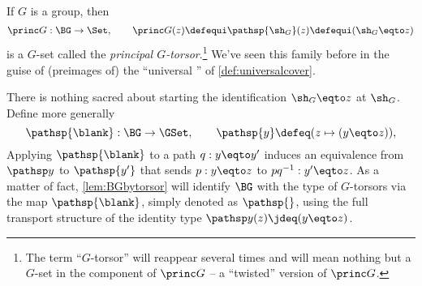 \begin{example}\label{def:principaltorsor}
  If $G$ is a group, then
  \[
    \princ G:\BG\to\Set,
    \qquad\princ G(z)\defequi\pathsp{\sh_G}(z)\defequi(\sh_G \eqto z)
  \]
  is a $G$-set called the \emph{principal $G$-torsor}.\footnote{%
    The term ``$G$-torsor'' will reappear several times and will mean nothing but a $G$-set in the component of $\princ G$ -- a ``twisted'' version of $\princ G$.}
  We've seen this family before in the guise of (preimages of) the
  ``universal \covering'' of \cref{def:universalcover}.

  There is nothing sacred about starting the identification
  $\sh_G \eqto z$ at $\sh_G$.
  Define more generally
  \begin{equation}\label{eq:pathsp}
    \pathsp{\blank}:\BG\to\GSet,
    \qquad
    \pathsp{y} \defeq (z \mapsto (y\eqto z)),
  \end{equation}
  Applying $\pathsp{\blank}$ to a path $q:y\eqto y'$
  induces an equivalence from $\pathsp y$ to $\pathsp {y'}$ that sends $p:y \eqto z$
  to $pq^{-1}:y'\eqto z$.
  As a matter of fact, \cref{lem:BGbytorsor} will identify $\BG$ with the type of
  $G$-torsors via the map $\pathsp{\blank}$, simply denoted as $\pathsp{}$,
  using the full transport structure of the identity type $\pathsp y(z)\jdeq(y \eqto z)$.
\end{example}


